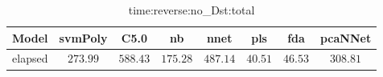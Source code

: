 \begin{table}[!ht]
	\centering
	\begin{tabular}{|c|c|c|c|c|c|c|c|}
		\hline
		Model & svmPoly & C5.0 & nb & nnet & pls & fda & pcaNNet \\ \hline
		elapsed & $273.99$ & $588.43$ & $175.28$ & $487.14$ & $40.51$ & $46.53$ & $308.81$ \\ \hline
	\end{tabular}
	\caption{time:reverse:no_Dst:total}
	\label{tab:time:reverse:no_Dst:total}
\end{table}
